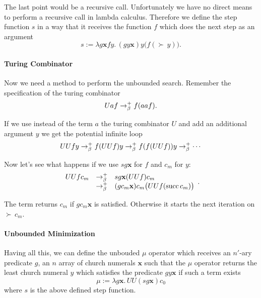 The last point would be a recursive call. Unfortunately we have no direct
means to perform a recursive call in lambda calculus. Therefore we define the
step function $s$ in a way that it receives the function $f$ which does the
next step as an argument
$$ s := \lambda g \mathbf{x} f y.\, (gy\mathbf{x}) y \big(f (\succ\, y)\big).$$


\paragraph{Turing Combinator} Now we need a method to perform the unbounded
search. Remember the specification of the turing combinator
$$ U a f \to^+_\beta f (a a f).$$

If we use instead of the term $a$ the turing combinator $U$ and add an
additional argument $y$ we get the
potential infinite loop
$$ U U f y\to^+_\beta f (U U f) y \to^+_\beta f (f (U U f)) y \to^+_\beta
\cdots $$

Now let's see what happens if we use $s g \mathbf{x}$ for $f$  and $c_m$ for $y$:
$$
\begin{array}{lll}
  U U f c_m  &\to^+_\beta & s g\mathbf{x} (U U f) c_m\\
  &\to^+_\beta&  (g c_m \mathbf{x}) c_m \big(U U f (\text{succ}\, c_m)\big)
\end{array}.
$$

The term returns $c_m$ if $g c_m \mathbf{x}$ is satisfied. Otherwise it starts
the next iteration on $\succ\, c_m$.


\paragraph{Unbounded Minimization} Having all this, we can define the unbouded
$\mu $ operator which receives an $n'$-ary predicate $g$, an $n$ array of
church numerals $\mathbf{x}$ such that the $\mu $ operator returns the least
church numeral $y$ which satisfies the predicate $g y \mathbf{x}$ if such a
term exists
$$ \mu := \lambda g \mathbf{x}.\, U U (s g \mathbf{x}) c_0$$
where $s$ is the above defined step function.